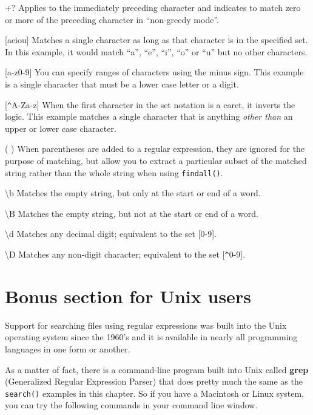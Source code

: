 \documentclass[11pt]{book}
\begin{document}
+? \newline
Applies to the immediately preceding character and indicates to match zero or more of the preceding character in ``non-greedy mode''.

[aeiou] \newline
Matches a single character as long as that character is in the specified set.  In this example, it would match ``a'', ``e'', ``i'', ``o'' or ``u'' but no other characters.

[a-z0-9] \newline
You can specify ranges of characters using the minus sign.  This example is a single character that must be a lower case letter or a digit.

[\verb"^"A-Za-z] \newline
When the first character in the set notation is a caret, it inverts the logic.  This example matches a single character that is anything {\em other than} an upper or lower case character.

( ) \newline
When parentheses are added to a regular expression, they are ignored for the purpose of matching, but allow you to extract a particular subset of the matched string rather than the whole string when using {\tt findall()}.

{\textbackslash}b \newline
Matches the empty string, but only at the start or end of a word.

{\textbackslash}B \newline
Matches the empty string, but not at the start or end of a word.

{\textbackslash}d \newline
Matches any decimal digit; equivalent to the set [0-9].

{\textbackslash}D \newline
Matches any non-digit character; equivalent to the set [\verb"^"0-9].

\section{Bonus section for Unix users}

Support for searching files using regular expressions was built into the Unix operating system 
since the 1960's and it is available in nearly all programming languages in one form or another.

As a matter of fact, there is a command-line program built into Unix 
called {\bf grep} (Generalized Regular Expression Parser) that does pretty much 
the same as the {\tt search()} examples in this chapter.  So if you have a 
Macintosh or Linux system, you can try the following commands in your command line window.
\end{document}
